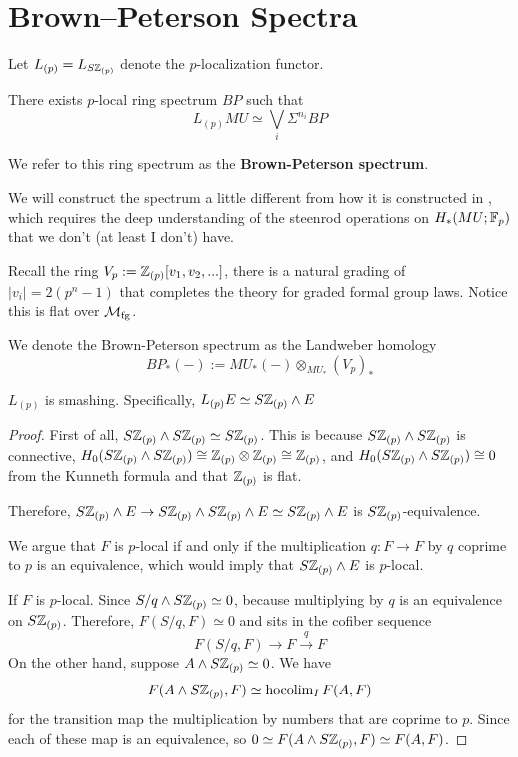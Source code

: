 \section{Brown--Peterson Spectra}\label{sec:chromatic-more-brownpeterson}

Let $L_{(p)}=L_{S\mathbb{Z}_{(p)}}$ denote the $p$-localization functor.
\begin{theorem}
    There exists $p$-local ring spectrum $BP$ such that 
    \[
        L_{(p)}MU\simeq \bigvee _i \Sigma^{n_i}BP
    \]
\end{theorem}
We refer to this ring spectrum as the \textbf{Brown-Peterson spectrum}.

We will construct the spectrum a little different from how it is constructed in \cite{ChrBrownPeterson}, which requires the deep understanding of the steenrod operations on $H_*(MU; \mathbb{F}_p)$ that we don't (at least I don't) have.

\begin{definition}
    Recall the ring $V_p:=\mathbb{Z}_{(p)}[v_1,v_2,...]$, there is a natural grading of $|v_i|=2(p^n-1)$ that completes the theory for graded formal group laws. Notice this is flat over $\mathcal{M}_{\mathrm{fg}}$.

    We denote the Brown-Peterson spectrum as the Landweber homology
    \[
        BP_*(-):=MU_*(-)\otimes_{MU_*}(V_p)_*
    \]
\end{definition}

\begin{lemma}
    $L_{(p)}$ is smashing. Specifically, $L_{(p)}E\simeq S\mathbb{Z}_{(p)}\wedge E$
\end{lemma}
\begin{proof}
    First of all, $ S\mathbb{Z}_{(p)}\wedge  S\mathbb{Z}_{(p)}\simeq S\mathbb{Z}_{(p)}$. This is because $S\mathbb{Z}_{(p)}\wedge  S\mathbb{Z}_{(p)}$ is connective, 
    $H_0(S\mathbb{Z}_{(p)}\wedge  S\mathbb{Z}_{(p)})\cong \mathbb{Z}_{(p)}\otimes \mathbb{Z}_{(p)}\cong \mathbb{Z}_{(p)}$, and $H_0(S\mathbb{Z}_{(p)}\wedge  S\mathbb{Z}_{(p)})\cong 0$ from the Kunneth formula and that $\mathbb{Z}_{(p)}$ is flat. 

    Therefore, $S\mathbb{Z}_{(p)}\wedge  E\to S\mathbb{Z}_{(p)}\wedge  S\mathbb{Z}_{(p)}\wedge E\simeq S\mathbb{Z}_{(p)}\wedge  E$ is $S\mathbb{Z}_{(p)}$-equivalence.

    We argue that $F$ is $p$-local if and only if the multiplication $q:F\to F$ by $q$ coprime to $p$ is an equivalence, which would imply that $S\mathbb{Z}_{(p)}\wedge  E$ is $p$-local.

    If $F$ is $p$-local. Since $S/q\wedge S\mathbb{Z}_{(p)}\simeq 0$, because multiplying by $q$ is an equivalence on $S\mathbb{Z}_{(p)}$. Therefore, $F(S/q, F)\simeq 0$ and sits in the cofiber sequence 
    \[
    F(S/q, F)\to F\xrightarrow{q}F
    \]
    On the other hand, suppose $A\wedge S\mathbb{Z}_{(p)}\simeq 0 $. We have 
    \[
        F(A\wedge S\mathbb{Z}_{(p)}, F)\simeq \operatorname{hocolim}_IF(A,F)
    \]for the transition map the multiplication by numbers that are coprime to $p$. Since each of these map is an equivalence, so $0\simeq F(A\wedge S\mathbb{Z}_{(p)}, F)\simeq F(A, F)$.
    
\end{proof}


